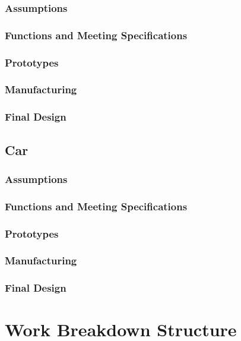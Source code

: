 \documentclass[fleqn,12pt]{project}
\begin{document}
\subsubsection{Assumptions}
\subsubsection{Functions and Meeting Specifications}
\subsubsection{Prototypes}
\subsubsection{Manufacturing}
\subsubsection{Final Design}

\subsection{Car}
\subsubsection{Assumptions}
\subsubsection{Functions and Meeting Specifications}
\subsubsection{Prototypes}
\subsubsection{Manufacturing}
\subsubsection{Final Design}

\newpage
\section{Work Breakdown Structure}
\end{document}
